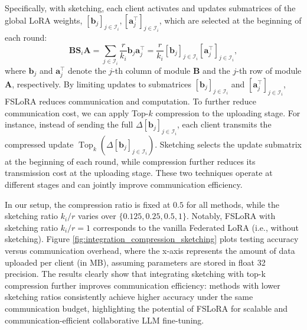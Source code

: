 \documentclass{article} %
\theoremstyle{plain}
\theoremstyle{definition}
\begin{document}
Specifically, with sketching, each client activates and updates submatrices of the global LoRA weights, 
$[\mathbf{b}_j]_{j \in \mathcal{I}_i}, [\mathbf{a}_j^\top]_{j \in \mathcal{I}_i}$, which are selected at the beginning of each round:
\[
\mathbf{BS}_i\mathbf{A} = \sum_{j \in \mathcal{I}_i} \frac{r}{k_i} \mathbf{b}_j \mathbf{a}_j^\top 
= \frac{r}{k_i} [\mathbf{b}_j]_{j \in \mathcal{I}_i} [\mathbf{a}_j^\top]_{j \in \mathcal{I}_i},
\]
where $\mathbf{b}_j$ and $\mathbf{a}_j^\top$ denote the $j$-th column of module $\mathbf{B}$ and the $j$-th row of module $\mathbf{A}$, respectively. By limiting updates to submatrices $[\mathbf{b}_j]_{j \in \mathcal{I}_i}$ and $[\mathbf{a}_j^\top]_{j \in \mathcal{I}_i}$, 
FSLoRA reduces communication and computation. To further reduce communication cost, we can apply Top-$k$ compression to the uploading stage. For instance, instead of sending the full 
$\Delta [\mathbf{b}_j]_{j \in \mathcal{I}_i}$, each client transmits the compressed update 
$\operatorname{Top}_k(\Delta [\mathbf{b}_j]_{j \in \mathcal{I}_i})$.  
Sketching selects the update submatrix at the beginning of each round, 
while compression further reduces its transmission cost at the uploading stage. 
These two techniques operate at different stages and can jointly improve 
communication efficiency.

In our setup, the compression ratio is fixed at \(0.5\) for all methods, while the sketching ratio \(k_i/r\) varies over \(\{0.125, 0.25, 0.5, 1\}\). Notably, FSLoRA with sketching ratio \(k_i/r = 1\) corresponds to the vanilla Federated LoRA (i.e., without sketching).
Figure \ref{fig:integration_compression_sketching} plots testing accuracy versus communication overhead, where the x-axis represents the amount of data uploaded per client (in MB), assuming parameters are stored in float 32 precision. 
The results clearly show that integrating sketching with top-k compression further improves communication efficiency: methods with lower sketching ratios consistently achieve higher accuracy under the same communication budget, highlighting the potential of FSLoRA for scalable and communication-efficient collaborative LLM fine-tuning.
\end{document}
